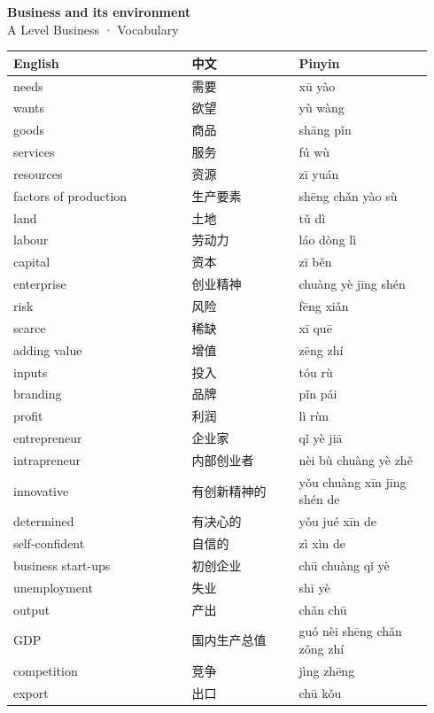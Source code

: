 \documentclass[11pt]{article}
\begin{document}
\begin{center}
  {\LARGE\bfseries Business and its environment}\\[0.35em]
  {\large A Level Business · Vocabulary}
\end{center}
\vspace{0.6em}

\begin{longtable}{@{}p{0.40\linewidth}p{0.24\linewidth}p{0.30\linewidth}@{}}
\toprule
\textbf{English} & \textbf{中文} & \textbf{Pinyin} \\
\midrule
\endhead
\bottomrule
\endlastfoot
needs & 需要 & xū yào \\
wants & 欲望 & yù wàng \\
goods & 商品 & shāng pǐn \\
services & 服务 & fú wù \\
resources & 资源 & zī yuán \\
factors of production & 生产要素 & shēng chǎn yào sù \\
land & 土地 & tǔ dì \\
labour & 劳动力 & láo dòng lì \\
capital & 资本 & zī běn \\
enterprise & 创业精神 & chuàng yè jīng shén \\
risk & 风险 & fēng xiǎn \\
scarce & 稀缺 & xī quē \\
adding value & 增值 & zēng zhí \\
inputs & 投入 & tóu rù \\
branding & 品牌 & pǐn pái \\
profit & 利润 & lì rùn \\
entrepreneur & 企业家 & qǐ yè jiā \\
intrapreneur & 内部创业者 & nèi bù chuàng yè zhě \\
innovative & 有创新精神的 & yǒu chuàng xīn jīng shén de \\
determined & 有决心的 & yǒu jué xīn de \\
self-confident & 自信的 & zì xìn de \\
business start-ups & 初创企业 & chū chuàng qǐ yè \\
unemployment & 失业 & shī yè \\
output & 产出 & chǎn chū \\
GDP & 国内生产总值 & guó nèi shēng chǎn zǒng zhí \\
competition & 竞争 & jìng zhēng \\
export & 出口 & chū kǒu \\

\end{longtable}
\end{document}

